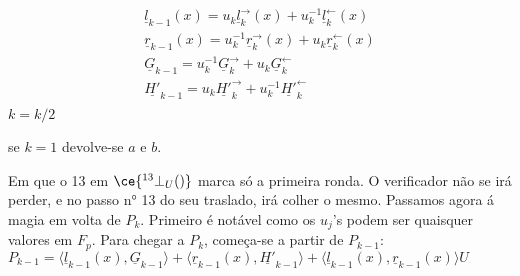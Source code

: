 \begin{align*}
\underline{l}_{k-1}(x) = u_{k} \underline{l}_{k}^{\rightarrow}(x) + u^{-1}_{k} \underline{l}_{k}^{\leftarrow}(x)\\
\underline{r}_{k-1}(x) = u^{-1}_{k} \underline{r}_{k}^{\rightarrow}(x) + u_{k} \underline{r}_{k}^{\leftarrow}(x)\\
\underline{G}_{k-1} = u^{-1}_{k} \underline{G}_{k}^{\rightarrow} + u_{k} \underline{G}_{k}^{\leftarrow}\\
\underline{H'}_{k-1} = u_{k} \underline{H'}_{k}^{\rightarrow} + u^{-1}_{k} \underline{H'}_{k}^{\leftarrow}\\
\end{align*}
$k=k/2$

se $k=1$ devolve-se $a$ e $b$.

Em que o 13 em $\ce{^{13}_{\ }\bot_U()}$ marca só a primeira ronda. O verificador não se irá perder, e no passo n° 13 do seu traslado, irá colher o mesmo. Passamos agora á magia em volta de $P_k$. Primeiro é notável como os $u_{j}$'s podem ser quaisquer valores em $F_p$. Para chegar a $P_k$, começa-se a partir de  $P_{k-1}$:\newline  
$
P_{k-1} = \langle \underline{l}_{k-1}(x),\underline{G}_{k-1}\rangle + \langle \underline{r}_{k-1}(x),\underline{H'}_{k-1}\rangle + \langle \underline{l}_{k-1}(x), \underline{r}_{k-1}(x)\rangle U
$

